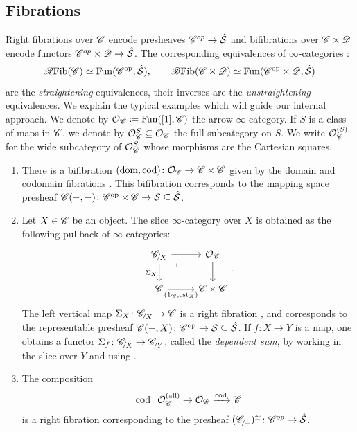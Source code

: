 \documentclass[twoside,a4paper,11pt]{amsart}
\begin{document}
\subsection{Fibrations}\label{subsection: fibrations}
Right fibrations over $\mathscr{C}$ encode presheaves $\mathscr{C}^{op}\to \hat{\mathcal{S}}$ and bifibrations over $\mathscr{C}\times\mathscr{D}$ encode functors $\mathscr{C}^{op}\times\mathscr{D}\to\hat{\mathcal{S}}$. The corresponding equivalences of $\infty$-categories \cite[Theorem~2.2.1.2]{LurieHTT}: 
\begin{equation}\label{eq: (un)straightening}
    \mathscr{R}\mathrm{Fib}(\mathscr{C})\simeq\mathrm{Fun}(\mathscr{C}^{\mathrm{op}},\hat{\mathcal{S}}),\qquad\mathscr{B}\mathrm{Fib}(\mathscr{C}\times\mathscr{D})\simeq\mathrm{Fun}(\mathscr{C}^{\mathrm{op}}\times\mathscr{D},\hat{\mathcal{S}})
\end{equation}
are the \emph{straightening} equivalences, their inverses are the \emph{unstraightening} equivalences. We explain the typical examples which will guide our internal approach. We denote by $\mathcal{O}_{\mathscr{C}}\coloneq\mathrm{Fun}([1],\mathscr{C})$ the arrow $\infty$-category. If $S$ is a class of maps in $\mathscr{C}$, we denote by $\mathcal{O}_{\mathscr{C}}^S\subseteq\mathcal{O}_{\mathscr{C}}$ the full subcategory on $S$. We write $\mathcal{O}_{\mathscr{C}}^{(S)}$ for the wide subcategory of $\mathcal{O}_{\mathscr{C}}^S$ whose morphisms are the Cartesian squares.
\begin{example}\label{examples: fibrations}
\begin{enumerate}[label=\arabic*., ref=\thelemma.\arabic*]
    \item There is a bifibration $(\mathrm{dom,cod})\colon\mathcal{O}_{\mathscr{C}}\to\mathscr{C}\times \mathscr{C}$ given by the domain and codomain fibrations \cite[Cor.~2.4.7.11]{LurieHTT}. This bifibration corresponds to the mapping space presheaf $\mathscr{C}(-,-)\colon\mathscr{C}^{\mathrm{op}}\times\mathscr{C}\to\mathcal{S}\subseteq \hat{\mathcal{S}}$.
    \item\label{examples: fibrations 2} Let $X\in\mathscr{C}$ be an object. The slice $\infty$-category over $X$ is obtained as the following pullback of $\infty$-categories:
\[\begin{tikzcd}
	{\slice{\C}{X}}\arrow[dr, phantom, "\lrcorner"{anchor=center, pos=0.125}] \arrow[r] \arrow[d, "{\Sigma_X}"'] & {\Orb_\C} \arrow[d] \\
	\C \arrow[r, "{(1_\C,\cst_X)}"'] & {\C\times\C}
\end{tikzcd}.\]
The left vertical map $\Sigma_X\colon \slice{\C}{X}\to\C$ is a right fibration \cite[Cor.~2.1.2.2]{LurieHTT}, and corresponds to the representable presheaf $\mathscr{C}(-,X)\colon \mathscr{C}^{\mathrm{op}}\to\mathcal{S}\subseteq \hat{\mathcal{S}}$. If $f\colon X\to Y$ is a map, one obtains a functor $\Sigma_f\colon\slice{\C}{X}\to\slice{\C}{Y}$, called the \textit{dependent sum}, by working in the slice over $Y$ and using .
\item The composition \[\mathrm{cod}\colon \mathcal{O}_{\mathscr{C}}^{(\mathrm{all})}\to \mathcal{O}_{\mathscr{C}}\xrightarrow{\mathrm{cod}}\mathscr{C}\] is a right fibration \cite[6.1.3.4]{LurieHTT} corresponding to the presheaf $(\slice{\C}{-})^\simeq\colon \C^{op}\to \hat{\Sp}$.
\end{enumerate}
\end{example}
\end{document}
